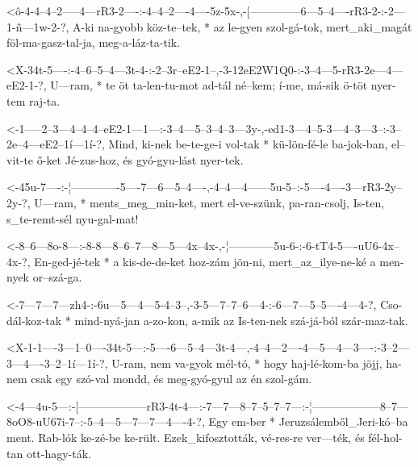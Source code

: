   {<ô-4-4--4--2-----4---rR3-2----:-4--4--2----4----5z-5x-,-[--------------6---5--4----rR3-2-:-2---1-ñ---1w-2-?,}
  {   A-ki na-gyobb köz-te--tek, * az le-gyen szol-gá-tok, mert_aki_magát föl-ma-gasz-tal-ja, meg-a-láz-ta-tik.}

  {<X-34t-5----:-4--6--5--4---3t-4-:-2--3r--eE2-1--,-3-12eE2W1Q0-:-3--4---5-rR3-2e---4---eE2-1-?,}
  {   U---ram, * te öt ta-len-tu-mot ad-tál né--kem; í-me,         má-sik ö-töt nyer-tem raj-ta.}


  {<-1-----2--3---4--4--4--eE2-1---1---:-3--4---5--3--4--3---3y-,-ed1-3---4--5-3---4--3---3--:-3--2e--4---eE2--1í---1í-?,}
  {  Mind, ki-nek be-te-ge-i   vol-tak * kü-lön-fé-le ba-jok-ban, el--vit-te ő-ket Jé-zus-hoz, és gyó-gyu-lást nyer-tek.}

  {<-45u-7----:-¦-------------5----7---6---5--4----,-4--4---4------5u-5--:-5----4----3---rR3-2y--2y-?,}
  {  U---ram, * ments_meg_min-ket, mert el-ve-szünk, pa-ran-csolj, Is-ten, s_te-remt-sél nyu-gal-mat!}

  {<-8--6---8o-8---:-8-8---8--6--7---8---5---4x--4x-,-¦------------5u-6-:-6-tT4-5----uU6-4x--4x-?,}
  {  En-ged-jé-tek * a kis-de-de-ket hoz-zám jön-ni,  mert_az_ilye-ne-ké  a men-nyek or--szá-ga.}


  {<-7---7---7---zh4-:-6u---5---4---5-4--3--,-3-5---7--7--6---4-:-6---7---5--5----4---4-?,}
  {  Cso-dál-koz-tak * mind-nyá-jan a-zo-kon, a-mik az Is-ten-nek szá-já-ból szár-maz-tak.}

  {<X-1-1----3---1--0----34t-5---:-5----6---5--4---3t-4---,-4--4---2----4---5---4---3----:-3--2---3---4----3--2--1í---1í-?,}
  {   U-ram, nem va-gyok mél-tó, * hogy haj-lé-kom-ba jöjj, ha-nem csak egy szó-val mondd, és meg-gyó-gyul az én szol-gám.}

  {<-4---4u-5---:-[------------------rR3-4t-4---:-7---7---8--7--5--7--7---:-¦------------------8--7---8oO8-uU67i-7--:-5--4---5---7---7---4----4-?,}
  {  Egy em-ber * Jeruzsálemből_Jeri-kó--ba ment. Rab-lók ke-zé-be ke-rült. Ezek_kifosztották, vé-res-re   ver---ték, és fél-hol-tan ott-hagy-ták.}

